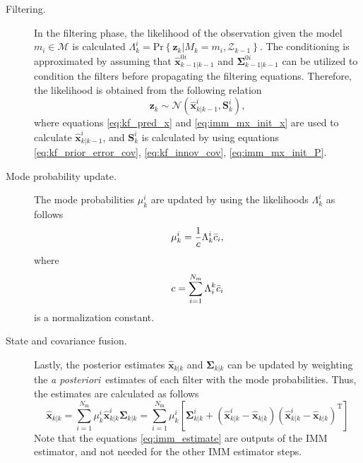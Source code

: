 \documentclass[english, 12pt, a4paper, elec, utf8, a-1b, online]{aaltothesis}
\renewcommand{\vec}[1]{\mathbf{#1}}
\renewcommand{\Pr}[1]{\text{Pr}\left\{ #1 \right\}}
\newcommand{\xpost}{\hat{\vec{x}}_{k|k}}
\newcommand{\postecov}{\boldsymbol{\Sigma}_{k|k}}
\newcommand{\z}{\vec{z}_k}
\newcommand{\normal}[2]{\mathcal{N}\left(#1, #2 \right)}
\newcommand{\transpose}[1]{#1^\text{T}}
\newcommand{\mxnorm}{ \Bar{c}_i }
\newcommand{\xmxinit}{\hat{\vec{x}}^{0i}_{k-1|k-1}}
\newcommand{\ecovmxinit}{\bm{\Sigma}^{0i}_{k-1|k-1}}
\newcommand{\modexprior}{\hat{\vec{x}}^{i}_{k|k-1}}
\newcommand{\modeinnovcov}{\mathbf{S}^i_{k}}
\newcommand{\modexpost}{\hat{\vec{x}}^{i}_{k|k}}
\newcommand{\modecovpost}{\bm{\Sigma}^i_{k|k}}
\newcommand{\modeobsprob}{\Lambda^i_k}
\def\post{\textit{a posteriori}\ }
\newcommand{\nmodels}{{N_\text{m}}}
\begin{document}
\begin{description}
\item[Filtering.]

In the filtering phase, the likelihood of the observation given the model $m_i \in \mathcal{M}$ is calculated  $\modeobsprob = \Pr{\z | M_k = m_i, \mathcal{Z}_{k-1}} $.
The conditioning is approximated by assuming that $\xmxinit$ and $\ecovmxinit$ can be utilized to condition the filters before propagating the filtering equations.
Therefore, the likelihood is obtained from the following relation
\begin{equation}
    \z \sim \normal{\modexprior}{\modeinnovcov},
\end{equation}
where equations \eqref{eq:kf_pred_x} and \eqref{eq:imm_mx_init_x} are used to calculate $\modexprior$, and $\modeinnovcov$ is calculated by using equations \eqref{eq:kf_prior_error_cov}, \eqref{eq:kf_innov_cov}, \eqref{eq:imm_mx_init_P}.

\item[Mode probability update.]

The mode probabilities $\mu^i_k$ are updated by using the likelihoods $\Lambda_k^i$ as follows
\begin{equation}
    \mu_k^i = \frac{1}{c} \Lambda^i_k \mxnorm,
\end{equation}
where
\begin{equation}
    c = \sum_{i=1}^\nmodels \Lambda_i^k \mxnorm
\end{equation}
is a normalization constant.

\item[State and covariance fusion.]
Lastly, the posterior estimates $\xpost$ and $\postecov$ can be updated by weighting the \post estimates of each filter with the mode probabilities.
Thus, the estimates are calculated as follows
\begin{subequations}
\label{eq:imm_estimate}
\begin{equation}\label{eq:imm_fusion_x}
    \xpost = \sum_{i=1}^\nmodels \mu_k^i \modexpost
\end{equation}
\begin{equation}\label{eq:imm_fusion_P}
    \postecov = \sum_{i=1}^\nmodels \mu_k^i 
    \left[ 
        \modecovpost + \left( \modexpost - \xpost \right) \transpose{\left( \modexpost - \xpost \right)}
    \right]
\end{equation}
\end{subequations}
Note that the equations \eqref{eq:imm_estimate} are outputs of the IMM estimator, and not needed for the other IMM estimator steps.
\end{description}
\end{document}
